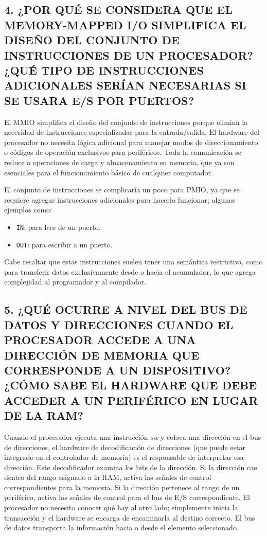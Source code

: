 \documentclass[12pt]{article}
\begin{document}
\subsection*{4. ¿POR QUÉ SE CONSIDERA QUE EL MEMORY-MAPPED I/O SIMPLIFICA EL DISEÑO DEL CONJUNTO DE INSTRUCCIONES DE UN PROCESADOR? ¿QUÉ TIPO DE INSTRUCCIONES ADICIONALES SERÍAN NECESARIAS SI SE USARA E/S POR PUERTOS?}

El MMIO simplifica el diseño del conjunto de instrucciones porque elimina la necesidad de instrucciones especializadas para la entrada/salida. El hardware del procesador no necesita lógica adicional para manejar modos de direccionamiento o códigos de operación exclusivos para periféricos. Toda la comunicación se reduce a operaciones de carga y almacenamiento en memoria, que ya son esenciales para el funcionamiento básico de cualquier computador.

El conjunto de instrucciones se complicaría un poco para PMIO, ya que se requiere agregar instrucciones adicionales para hacerlo funcionar; algunos ejemplos como:
\begin{itemize}
    \item \texttt{IN}: para leer de un puerto.
    \item \texttt{OUT}: para escribir a un puerto.
\end{itemize}
Cabe resaltar que estas instrucciones suelen tener una semántica restrictiva, como para transferir datos exclusivamente desde o hacia el acumulador, lo que agrega complejidad al programador y al compilador.

\subsection*{5. ¿QUÉ OCURRE A NIVEL DEL BUS DE DATOS Y DIRECCIONES CUANDO EL PROCESADOR ACCEDE A UNA DIRECCIÓN DE MEMORIA QUE CORRESPONDE A UN DISPOSITIVO? ¿CÓMO SABE EL HARDWARE QUE DEBE ACCEDER A UN PERIFÉRICO EN LUGAR DE LA RAM?}

Cuando el procesador ejecuta una instrucción \textit{sw} y coloca una dirección en el bus de direcciones, el hardware de decodificación de direcciones (que puede estar integrado en el controlador de memoria) es el responsable de interpretar esa dirección. Este decodificador examina los bits de la dirección. Si la dirección cae dentro del rango asignado a la RAM, activa las señales de control correspondientes para la memoria. Si la dirección pertenece al rango de un periférico, activa las señales de control para el bus de E/S correspondiente. El procesador no necesita conocer qué hay al otro lado; simplemente inicia la transacción y el hardware se encarga de encaminarla al destino correcto. El bus de datos transporta la información hacia o desde el elemento seleccionado.
\end{document}
